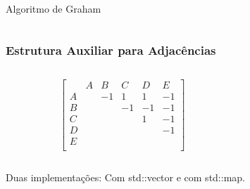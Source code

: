 \documentclass[aspectratio=169,usenames,dvipsnames]{beamer}
\begin{document}
\begin{frame}{Algoritmo de Graham}
  \begin{columns}
    \begin{column}{0.5\textwidth}
      
    \end{column}
    \begin{column}{0.5\textwidth}
        \begin{itemize}
        \end{itemize}
    \end{column}
  \end{columns}
\end{frame}

\begin{frame}
  \frametitle{Estrutura Auxiliar para Adjacências}
  
  \begin{columns}
   \begin{column}{0.5\textwidth}
  \[
  \begin{bmatrix}
      & A & B & C & D & E \\
  A &   & -1 & 1 &  1& -1 \\
  B &   &    & -1  & -1  & -1 \\
  C &   &    &    & 1  & -1 \\
  D &   &    &    &    & -1 \\
  E &   &    &    &    &   \\
  \end{bmatrix}
  \]
   \end{column} 
   \begin{column}{0.5\textwidth}
    
    
   \end{column} 
  \end{columns}

  Duas implementações: Com std::vector e com std::map.
  
  \end{frame}
\end{document}
